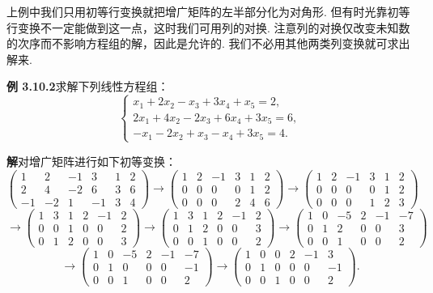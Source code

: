 \documentclass[UTF8, 12pt, fontset=fandol, oneside]{ctexart}
\begin{document}
上例中我们只用初等行变换就把增广矩阵的左半部分化为对角形. 但有时光靠初等行变换不一定能做到这一点，这时我们可用列的对换. 注意列的对换仅改变未知数的次序而不影响方程组的解，因此是允许的. 我们不必用其他两类列变换就可求出解来.

\noindent\textbf{例 3.10.2}\quad 求解下列线性方程组：
\[
\left\{\begin{array}{r}
x_1+2x_2-x_3+3x_4+x_5=2,\\
2x_1+4x_2-2x_3+6x_4+3x_5=6,\\
-x_1-2x_2+x_3-x_4+3x_5=4.
\end{array}\right.
\]

\noindent\textbf{解}\quad 对增广矩阵进行如下初等变换：
\[
\left(\begin{array}{rrrrr|r}
1&2&-1&3&1&2\\
2&4&-2&6&3&6\\
-1&-2&1&-1&3&4
\end{array}\right)
\to
\left(\begin{array}{rrrrr|r}
1&2&-1&3&1&2\\
0&0&0&0&1&2\\
0&0&0&2&4&6
\end{array}\right)
\to
\left(\begin{array}{rrrrr|r}
1&2&-1&3&1&2\\
0&0&0&0&1&2\\
0&0&0&1&2&3
\end{array}\right)
\]
\[
\to
\left(\begin{array}{rrrrr|r}
1&3&1&2&-1&2\\
0&0&1&0&0&2\\
0&1&2&0&0&3
\end{array}\right)
\to
\left(\begin{array}{rrrrr|r}
1&3&1&2&-1&2\\
0&1&2&0&0&3\\
0&0&1&0&0&2
\end{array}\right)
\to
\left(\begin{array}{rrrrr|r}
1&0&-5&2&-1&-7\\
0&1&2&0&0&3\\
0&0&1&0&0&2
\end{array}\right)
\]
\[
\to
\left(\begin{array}{rrrrr|r}
1&0&-5&2&-1&-7\\
0&1&0&0&0&-1\\
0&0&1&0&0&2
\end{array}\right)
\to
\left(\begin{array}{rrrrr|r}
1&0&0&2&-1&3\\
0&1&0&0&0&-1\\
0&0&1&0&0&2
\end{array}\right).
\]
\end{document}
